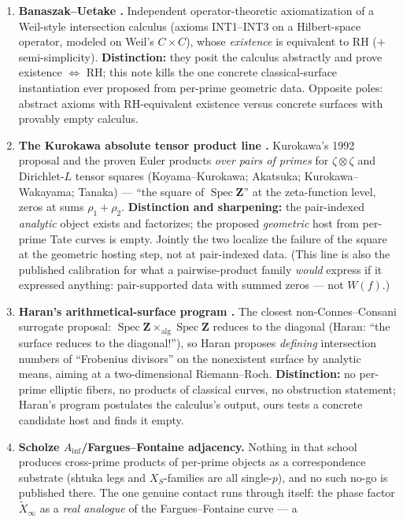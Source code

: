 \documentclass[11pt]{article}
\theoremstyle{definition}
\theoremstyle{remark}
\newcommand{\Z}{\mathbf{Z}}
\newcommand{\SpecZ}{\operatorname{Spec}\Z}
\begin{document}
\begin{enumerate}
\item \textbf{Banaszak--Uetake \cite{BU1, BU2, BU3}.} Independent
operator-theoretic axiomatization of a Weil-style intersection calculus
(axioms INT1--INT3 on a Hilbert-space operator, modeled on Weil's
$C \times C$), whose \emph{existence} is equivalent to RH ($+$
semi-simplicity). \textbf{Distinction:} they posit the calculus abstractly
and prove existence $\Longleftrightarrow$ RH; this note kills the one
concrete classical-surface instantiation ever proposed from per-prime
geometric data. Opposite poles: abstract axioms with RH-equivalent
existence versus concrete surfaces with provably empty calculus.
\item \textbf{The Kurokawa absolute tensor product line
\cite{Ku92, Ak09, Ta20}.} Kurokawa's 1992 proposal and the proven Euler
products \emph{over pairs of primes} for $\zeta \otimes \zeta$ and
Dirichlet-$L$ tensor squares (Koyama--Kurokawa; Akatsuka;
Kurokawa--Wakayama; Tanaka) --- ``the square of $\SpecZ$'' at the
zeta-function level, zeros at sums $\rho_1 + \rho_2$. \textbf{Distinction
and sharpening:} the pair-indexed \emph{analytic} object exists and
factorizes; the proposed \emph{geometric} host from per-prime Tate curves is
empty. Jointly the two localize the failure of the square at the geometric
hosting step, not at pair-indexed data. (This line is also the published
calibration for what a pairwise-product family \emph{would} express if it
expressed anything: pair-supported data with summed zeros --- not $W(f)$.)
\item \textbf{Haran's arithmetical-surface program \cite{Ha91}.} The closest
non-Connes--Consani surrogate proposal:
$\SpecZ \times_{\mathrm{alg}} \SpecZ$ reduces to the diagonal (Haran: ``the
surface reduces to the diagonal!''), so Haran proposes \emph{defining}
intersection numbers of ``Frobenius divisors'' on the nonexistent surface by
analytic means, aiming at a two-dimensional Riemann--Roch. \textbf{Distinction:} no per-prime elliptic fibers, no
products of classical curves, no obstruction statement; Haran's program
postulates the calculus's output, ours tests a concrete candidate host and
finds it empty.
\item \textbf{Scholze $A_{\mathrm{inf}}$/Fargues--Fontaine adjacency.}
Nothing in that school produces cross-prime products of per-prime objects as
a correspondence substrate (shtuka legs and $X_S$-families are all
single-$p$), and no such no-go is published there. The one genuine contact
runs through \cite{CC26} itself: the phase factor $\widetilde{X}_\infty$ as
a \emph{real analogue} of the Fargues--Fontaine curve --- a

\end{enumerate}
\end{document}
